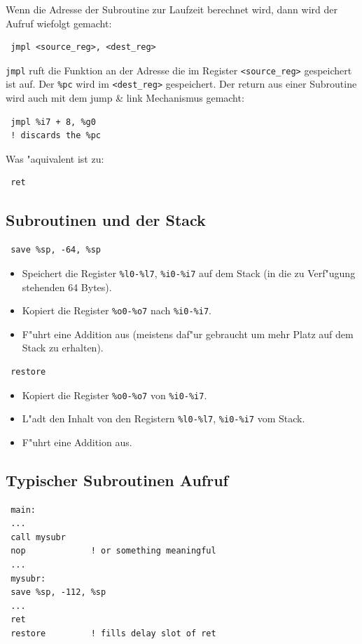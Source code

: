 \documentclass[german, 10pt, a4paper, twocolumn]{scrartcl}
\begin{document}
Wenn die Adresse der Subroutine zur Laufzeit berechnet wird, dann wird der Aufruf wiefolgt gemacht:
\begin{verbatim}
 jmpl <source_reg>, <dest_reg>
\end{verbatim}
\verb#jmpl# ruft die Funktion an der Adresse die im Register \verb#<source_reg># gespeichert ist auf. Der \verb#%pc# wird im \verb#<dest_reg># gespeichert. Der return aus einer Subroutine wird auch mit dem jump \& link Mechanismus gemacht:
\begin{verbatim}
 jmpl %i7 + 8, %g0
 ! discards the %pc
\end{verbatim}

Was "aquivalent ist zu:
\begin{verbatim}
 ret
\end{verbatim}

\subsection{Subroutinen und der Stack}

\begin{verbatim}
 save %sp, -64, %sp
\end{verbatim}
\begin{itemize}
	\item Speichert die Register \verb#%l0-%l7#, \verb#%i0-%i7# auf dem Stack (in die zu Verf"ugung stehenden 64 Bytes).
	\item Kopiert die Register \verb#%o0-%o7# nach \verb#%i0-%i7#.
	\item F"uhrt eine Addition aus (meistens daf"ur gebraucht um mehr Platz auf dem Stack zu erhalten).
\end{itemize}

\begin{verbatim}
 restore
\end{verbatim}
\begin{itemize}
	\item Kopiert die Register \verb#%o0-%o7# von \verb#%i0-%i7#.
	\item L"adt den Inhalt von den Registern \verb#%l0-%l7#, \verb#%i0-%i7# vom Stack.
	\item F"uhrt eine Addition aus.
\end{itemize}

\subsection{Typischer Subroutinen Aufruf}

\begin{verbatim}
 main:
 ...
 call mysubr
 nop             ! or something meaningful
 ...
 mysubr:
 save %sp, -112, %sp
 ...
 ret
 restore         ! fills delay slot of ret
\end{verbatim}
\end{document}
